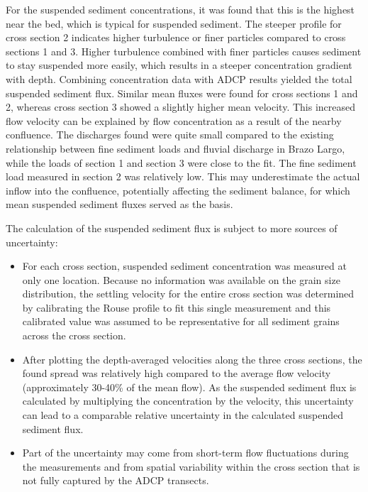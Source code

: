 For the suspended sediment concentrations, it was found that this is the highest near the bed, which is typical for suspended sediment. The steeper profile for cross section 2 indicates higher turbulence or finer particles compared to cross sections 1 and 3. Higher turbulence combined with finer particles causes sediment to stay suspended more easily, which results in a steeper concentration gradient with depth. Combining concentration data with ADCP results yielded the total suspended sediment flux. Similar mean fluxes were found for cross sections 1 and 2, whereas cross section 3 showed a slightly higher mean velocity. This increased flow velocity can be explained by flow concentration as a result of the nearby confluence. The discharges found were quite small compared to the existing relationship between fine sediment loads and fluvial discharge in Brazo Largo, while the loads of section 1 and section 3 were close to the fit. The fine sediment load measured in section 2 was relatively low. This may underestimate the actual inflow into the confluence, potentially affecting the sediment balance, for which mean suspended sediment fluxes served as the basis.

The calculation of the suspended sediment flux is subject to more sources of uncertainty:
\begin{itemize}
    \item For each cross section, suspended sediment concentration was measured at only one location. Because no information was available on the grain size distribution, the settling velocity for the entire cross section was determined by calibrating the Rouse profile to fit this single measurement and this calibrated value was assumed to be representative for all sediment grains across the cross section.
    \item After plotting the depth-averaged velocities along the three cross sections, the found spread was relatively high compared to the average flow velocity (approximately  30-40\% of the mean flow). As the suspended sediment flux is calculated by multiplying the concentration by the velocity, this uncertainty can lead to a comparable relative uncertainty in the calculated suspended sediment flux.
    \item Part of the uncertainty may come from short-term flow fluctuations during the measurements and from spatial variability within the cross section that is not fully captured by the ADCP transects. 
\end{itemize}


